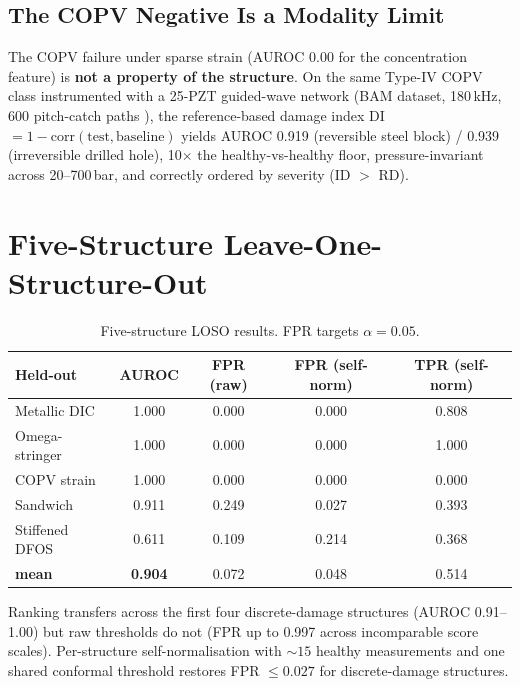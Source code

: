 \documentclass[10pt]{llncs}      %
\begin{document}
\subsection{The COPV Negative Is a Modality Limit}
\label{sec:copv}

The COPV failure under sparse strain (AUROC 0.00 for the concentration feature)
is \textbf{not a property of the structure}.
On the same Type-IV COPV class instrumented with a 25-PZT guided-wave network
(BAM dataset, 180\,kHz, 600 pitch-catch paths \cite{lozano2026}), the
reference-based damage index DI $= 1 - \text{corr}(\text{test},\text{baseline})$
yields AUROC 0.919 (reversible steel block) / 0.939 (irreversible drilled hole),
10$\times$ the healthy-vs-healthy floor, pressure-invariant across 20--700\,bar,
and correctly ordered by severity (ID $>$ RD).

\section{Five-Structure Leave-One-Structure-Out}
\label{sec:loso}

\begin{table}[h]
  \caption{Five-structure LOSO results. FPR targets $\alpha = 0.05$.}
  \label{tab:loso}
  \small
  \centering
  \begin{tabular}{lcccc}
    \toprule
    Held-out & AUROC & FPR (raw) & FPR (self-norm) & TPR (self-norm) \\
    \midrule
    Metallic DIC & 1.000 & 0.000 & 0.000 & 0.808 \\
    Omega-stringer & 1.000 & 0.000 & 0.000 & 1.000 \\
    COPV strain & 1.000 & 0.000 & 0.000 & 0.000 \\
    Sandwich & 0.911 & 0.249 & 0.027 & 0.393 \\
    Stiffened DFOS & 0.611 & 0.109 & 0.214 & 0.368 \\
    \midrule
    \textbf{mean} & \textbf{0.904} & 0.072 & 0.048 & 0.514 \\
    \bottomrule
  \end{tabular}
\end{table}

Ranking transfers across the first four discrete-damage structures (AUROC
0.91--1.00) but raw thresholds do not (FPR up to 0.997 across incomparable
score scales).
Per-structure self-normalisation with $\sim\!15$ healthy measurements and one
shared conformal threshold restores FPR $\leq 0.027$ for discrete-damage
structures.
\end{document}
